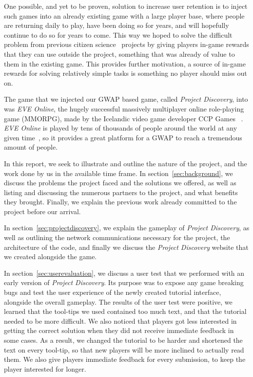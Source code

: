 One possible, and yet to be proven, solution to increase user retention is to inject such games into an already existing game with a large player base, where people are returning daily to play, have been doing so for years, and will hopefully continue to do so for years to come. This way we hoped to solve the difficult problem from previous citizen science~\cite{citizenscience} projects by giving players in-game rewards that they can use outside the project, something that was already of value to them in the existing game. This provides further motivation, a source of in-game rewards for solving relatively simple tasks is something no player should miss out on.

The game that we injected our GWAP based game, called \emph{Project Discovery}, into was \emph{EVE Online}, the hugely successful massively multiplayer online role-playing game (MMORPG), made by the Icelandic video game developer CCP Games~\cite{CCP} . \emph{EVE Online} is played by tens of thousands of people around the world at any given time~\cite{nature}, so it provides a great platform for a GWAP to reach a tremendous amount of people.


In this report, we seek to illustrate and outline the nature of the project, and the work done by us in the available time frame. In section~\ref{sec:background}, we discuss the problems the project faced and the solutions we offered, as well as listing and discussing the numerous partners to the project, and what benefits they brought. Finally, we explain the previous work already committed to the project before our arrival.

In section~\ref{sec:projectdiscovery}, we explain the gameplay of \emph{Project Discovery}, as well as outlining the network communications necessary for the project, the architecture of the code, and finally we discuss the \emph{Project Discovery} website that we created alongside the game. 

In section~\ref{sec:userevaluation}, we discuss a user test that we performed with an early version of \emph{Project Discovery}. Its purpose was to expose any game breaking bugs and test the user experience of the newly created tutorial interface, alongside the overall gameplay. The results of the user test were positive, we learned that the tool-tips we used contained too much text, and that the tutorial needed to be more difficult. We also noticed that players got less interested in getting the correct solution when they did not receive immediate feedback in some cases. As a result, we changed the tutorial to be harder and shortened the text on every tool-tip, so that new players will be more inclined to actually read them. We also give players immediate feedback for every submission, to keep the player interested for longer.

